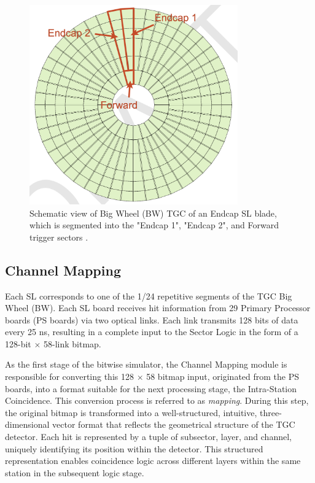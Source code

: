 \begin{figure}[htbp]
  \centering
  \includegraphics[width=0.8\textwidth]{figs/chapter5/endcap_and_forward_region.png}
  \caption{Schematic view of Big Wheel (BW) TGC of an Endcap SL blade, which is segmented into the "Endcap 1", "Endcap 2", and Forward trigger sectors \cite{EndcapSLPDR}.}
  \label{fig:endcapAndForward}
\end{figure}

\subsection{Channel Mapping} \label{subsec:ChannelMapping}
Each SL corresponds to one of the 1/24 repetitive segments of the TGC Big Wheel (BW). Each SL board receives hit information from 29 Primary Processor boards (PS boards) via two optical links. Each link transmits 128 bits of data every 25 ns, resulting in a complete input to the Sector Logic in the form of a 128-bit $\times$ 58-link bitmap.

As the first stage of the bitwise simulator, the Channel Mapping module is responsible for converting this 128 $\times$ 58 bitmap input, originated from the PS boards, into a format suitable for the next processing stage, the Intra-Station Coincidence. This conversion process is referred to as \textit{mapping}. During this step, the original bitmap is transformed into a well-structured, intuitive, three-dimensional vector format that reflects the geometrical structure of the TGC detector. Each hit is represented by a tuple of subsector, layer, and channel, uniquely identifying its position within the detector. This structured representation enables coincidence logic across different layers within the same station in the subsequent logic stage.
